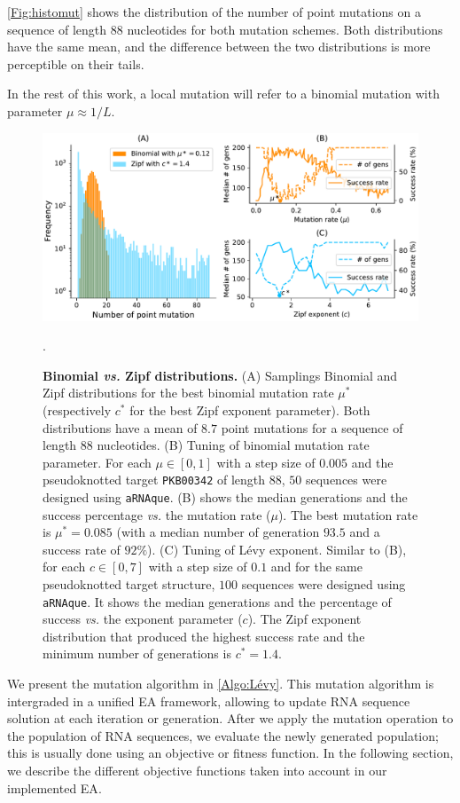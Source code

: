 \autoref{Fig:histomut} shows the distribution of the number of point mutations on a sequence of length $88$ nucleotides for both mutation schemes. Both distributions have the same mean, and the difference between the two distributions is more perceptible on their tails. 

In the rest of this work, a local mutation will refer to a binomial mutation with parameter $\mu \approx 1/L$.

\begin{figure}[ht]
	\includegraphics[width=1.0 \linewidth]{../res/images/arnaque/fig1.pdf}
	\caption{ \textbf{Binomial \emph{vs.} Zipf distributions.} (A) Samplings Binomial and Zipf distributions for the best binomial mutation rate $\mu^*$ (respectively $c^*$ for the best Zipf exponent parameter). Both distributions have a mean of $8.7$ point mutations for a sequence of length $88$ nucleotides. (B) Tuning of binomial mutation rate parameter. For each $\mu \in [0,1]$ with a step size of $0.005$ and the pseudoknotted target \texttt{PKB00342} of length $88$, $50$ sequences were designed using \texttt{aRNAque}. (B) shows the median generations and the success percentage \emph{vs.} the mutation rate ($\mu$). The best mutation rate is $\mu^*=0.085$ (with a median number of generation $93.5$ and a success rate of $92\%$). (C) Tuning of Lévy exponent. Similar to (B), for each $c \in [0,7]$ with a step size of $0.1$ and for the same pseudoknotted target structure, $100$ sequences were designed using \texttt{aRNAque}. It shows the median generations and the percentage of success \emph{vs.} the exponent parameter ($c$). The Zipf exponent distribution that produced the highest success rate and the minimum number of generations is $c^*=1.4$.}\label{Fig:histomut}. 
\end{figure}
We present the mutation algorithm in \autoref{Algo:Lévy}. This mutation algorithm is intergraded in a unified \ac{EA} framework, allowing to update RNA sequence solution at each iteration or generation. After we apply the mutation operation to the population of RNA sequences, we evaluate the newly generated population; this is usually done using an objective or fitness function. In the following section, we describe the different objective functions taken into account in our implemented \ac{EA}.

